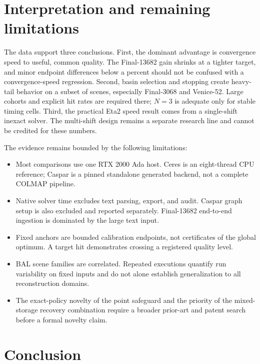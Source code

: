 \documentclass[10pt]{article}
\begin{document}
\section{Interpretation and remaining limitations}

The data support three conclusions.  First, the dominant advantage is convergence speed to useful, common quality.  The Final-13682 gain shrinks at a tighter target, and minor endpoint differences below a percent should not be confused with a convergence-speed regression.  Second, basin selection and stopping create heavy-tail behavior on a subset of scenes, especially Final-3068 and Venice-52.  Large cohorts and explicit hit rates are required there; $N=3$ is adequate only for stable timing cells.  Third, the practical Eta2 speed result comes from a single-shift inexact solver.  The multi-shift design remains a separate research line and cannot be credited for these numbers.

The evidence remains bounded by the following limitations:
\begin{itemize}
  \item Most comparisons use one RTX 2000 Ada host.  Ceres is an eight-thread CPU reference; Caspar is a pinned standalone generated backend, not a complete COLMAP pipeline.
  \item Native solver time excludes text parsing, export, and audit.  Caspar graph setup is also excluded and reported separately.  Final-13682 end-to-end ingestion is dominated by the large text input.
  \item Fixed anchors are bounded calibration endpoints, not certificates of the global optimum.  A target hit demonstrates crossing a registered quality level.
  \item BAL scene families are correlated.  Repeated executions quantify run variability on fixed inputs and do not alone establish generalization to all reconstruction domains.
  \item The exact-policy novelty of the point safeguard and the priority of the mixed-storage recovery combination require a broader prior-art and patent search before a formal novelty claim.
\end{itemize}

\section{Conclusion}
\end{document}
